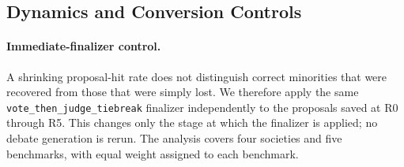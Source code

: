\clearpage
\subsection{Dynamics and Conversion Controls}
\label{app:dynamics_conversion_controls}
\paragraph{Immediate-finalizer control.}
A shrinking proposal-hit rate does not distinguish correct minorities that
were recovered from those that were simply lost. We therefore apply the same
\texttt{vote\_then\_judge\_tiebreak} finalizer independently to the proposals
saved at R0 through R5. This changes only the stage at which the finalizer is
applied; no debate generation is rerun. The analysis covers four societies and
five benchmarks, with equal weight assigned to each benchmark.

